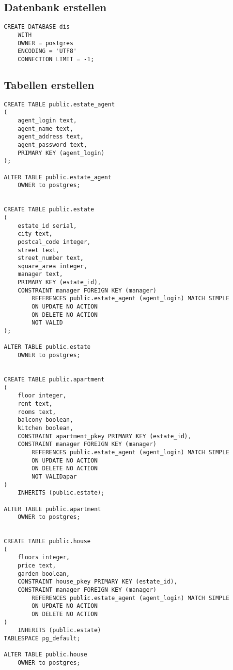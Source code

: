 \documentclass[ngerman]{dis-template-add}
\begin{document}
\subsection*{Datenbank erstellen}

\begin{verbatim}
CREATE DATABASE dis
    WITH 
    OWNER = postgres
    ENCODING = 'UTF8'
    CONNECTION LIMIT = -1;
\end{verbatim}


\subsection*{Tabellen erstellen}

\begin{verbatim}
CREATE TABLE public.estate_agent
(
    agent_login text,
    agent_name text,
    agent_address text,
    agent_password text,
    PRIMARY KEY (agent_login)
);

ALTER TABLE public.estate_agent
    OWNER to postgres;
    

CREATE TABLE public.estate
(
    estate_id serial,
    city text,
    postcal_code integer,
    street text,
    street_number text,
    square_area integer,
    manager text,
    PRIMARY KEY (estate_id),
    CONSTRAINT manager FOREIGN KEY (manager)
        REFERENCES public.estate_agent (agent_login) MATCH SIMPLE
        ON UPDATE NO ACTION
        ON DELETE NO ACTION
        NOT VALID
);

ALTER TABLE public.estate
    OWNER to postgres;


CREATE TABLE public.apartment
(
    floor integer,
    rent text,
    rooms text,
    balcony boolean,
    kitchen boolean,
    CONSTRAINT apartment_pkey PRIMARY KEY (estate_id),
    CONSTRAINT manager FOREIGN KEY (manager)
        REFERENCES public.estate_agent (agent_login) MATCH SIMPLE
        ON UPDATE NO ACTION
        ON DELETE NO ACTION
        NOT VALIDapar
)
    INHERITS (public.estate);

ALTER TABLE public.apartment
    OWNER to postgres;


CREATE TABLE public.house
(
    floors integer,
    price text,
    garden boolean,
    CONSTRAINT house_pkey PRIMARY KEY (estate_id),
    CONSTRAINT manager FOREIGN KEY (manager)
        REFERENCES public.estate_agent (agent_login) MATCH SIMPLE
        ON UPDATE NO ACTION
        ON DELETE NO ACTION
)
    INHERITS (public.estate)
TABLESPACE pg_default;

ALTER TABLE public.house
    OWNER to postgres;



\end{verbatim}
\end{document}
